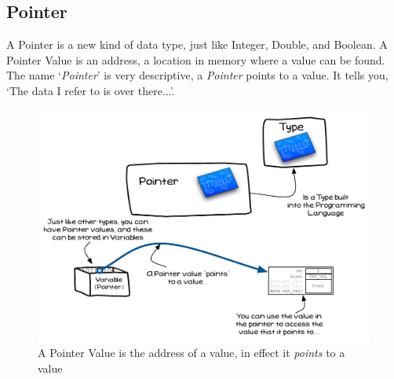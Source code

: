 \clearpage
\subsection{Pointer} %
\label{sub:pointer}

A Pointer is a new kind of data type, just like Integer, Double, and Boolean. A Pointer Value is an address, a location in memory where a value can be found. The name `\emph{Pointer}' is very descriptive, a \emph{Pointer} points to a value. It tells you, `The data I refer to is over there...'.

\begin{figure}[h]
   \centering
   \includegraphics[width=\textwidth]{./topics/dynamic-memory/diagrams/Pointer} 
   \caption{A Pointer Value is the address of a value, in effect it \emph{points} to a value}
   \label{fig:pointer}
\end{figure}


